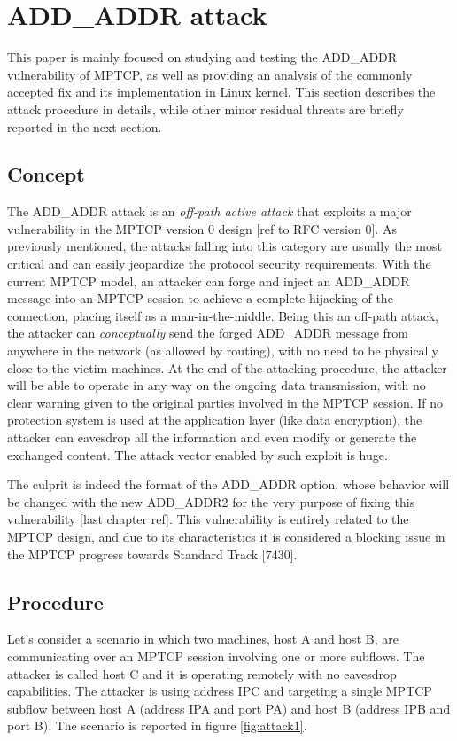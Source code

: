 \section{ADD\_ADDR attack} 
\label{theaddaddrattack}
This paper is mainly focused on studying and testing the ADD\_ADDR vulnerability of MPTCP, as well as providing an analysis of the commonly accepted fix and its implementation in Linux kernel. This section describes the attack procedure in details, while other minor residual threats are briefly reported in the next section.

\subsection{Concept}
The ADD\_ADDR attack is an \textit{off-path active attack} that exploits a major vulnerability in the MPTCP version 0 design [ref to RFC version 0]. As previously mentioned, the attacks falling into this category are usually the most critical and can easily jeopardize the protocol security requirements.
With the current MPTCP model, an attacker can forge and inject an ADD\_ADDR message into an MPTCP session to achieve a complete hijacking of the connection, placing itself as a man-in-the-middle. Being this an off-path attack, the attacker can \textit{conceptually} send the forged ADD\_ADDR message from anywhere in the network (as allowed by routing), with no need to be physically close to the victim machines. At the end of the attacking procedure, the attacker will be able to operate in any way on the ongoing data transmission, with no clear warning given to the original parties involved in the MPTCP session.
If no protection system is used at the application layer (like data encryption), the attacker can eavesdrop all the information and even modify or generate the exchanged content. The attack vector enabled by such exploit is huge.


The culprit is indeed the format of the ADD\_ADDR option, whose behavior will be changed with the new ADD\_ADDR2 for the very purpose of fixing this vulnerability [last chapter ref].
This vulnerability is entirely related to the MPTCP design, and due to its characteristics it is considered a blocking issue in the MPTCP progress towards Standard Track [7430].

\subsection{Procedure}
Let's consider a scenario in which two machines, host A and host B, are communicating over an MPTCP session involving one or more subflows. The attacker is called host C and it is operating remotely with no eavesdrop capabilities. The attacker is using address IPC and targeting a single MPTCP subflow between host A (address IPA and port PA) and host B (address IPB and port B). The scenario is reported in figure \ref{fig:attack1}.

